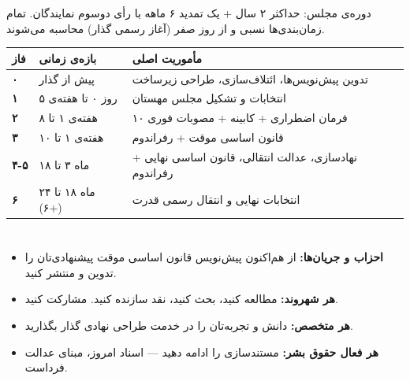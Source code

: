 \documentclass[a4paper,11pt]{article}
\begin{document}
\vspace{0.5\baselineskip}

{\footnotesize\textcolor{text-medium}{%
دوره‌ی مجلس: حداکثر ۲ سال + یک تمدید ۶ ماهه با رأی دوسوم نمایندگان.
تمام زمان‌بندی‌ها نسبی و از روز صفر (آغاز رسمی گذار) محاسبه می‌شوند.}}

\vspace{0.5\baselineskip}

\nopagebreak[4]%

\begin{center}
\setlength{\tabcolsep}{5pt}%
\begin{tabularx}{0.92\textwidth}{>{\centering\bfseries\small}p{1cm}
>{\centering\small}p{3cm} >{\small\RaggedRight}X}
\toprule
\rowcolor{bg-light-blue}
\textcolor{mahestan-blue}{فاز} &
\textcolor{mahestan-blue}{\bfseries بازه‌ی زمانی} &
\textcolor{mahestan-blue}{\bfseries مأموریت اصلی} \\
\midrule
۰ & پیش از گذار &
تدوین پیش‌نویس‌ها، ائتلاف‌سازی، طراحی زیرساخت \\
\rowcolor{bg-gray}
۱ & روز ۰ تا هفته‌ی ۵ &
انتخابات و تشکیل مجلس مهستان \\
۲ & هفته‌ی ۱ تا ۸ &
۱۰ فرمان اضطراری + کابینه + مصوبات فوری \\
\rowcolor{bg-gray}
۳ & هفته‌ی ۱ تا ۱۰ &
قانون اساسی موقت + رفراندوم \\
۴-۵ & ماه ۳ تا ۱۸ &
نهادسازی، عدالت انتقالی، قانون اساسی نهایی + رفراندوم \\
\rowcolor{bg-gray}
۶ & ماه ۱۸ تا ۲۴ (+۶) &
انتخابات نهایی و انتقال رسمی قدرت \\
\bottomrule
\end{tabularx}
\end{center}

\section{}

\begin{greenbox}[title={\rl{دعوت از همه‌ی ایرانیان آزادیخواه}}]
\begin{itemize}[itemsep=6pt, font=\small]
\item[\textcolor{mahestan-blue}{\textbullet}]
\textbf{احزاب و جریان‌ها:}
از هم‌اکنون پیش‌نویس قانون اساسی موقت پیشنهادی‌تان را
تدوین و منتشر کنید.
\item[\textcolor{mahestan-green}{\textbullet}]
\textbf{هر شهروند:}
مطالعه کنید، بحث کنید، نقد سازنده کنید. مشارکت کنید.
\item[\textcolor{mahestan-orange}{\textbullet}]
\textbf{هر متخصص:}
دانش و تجربه‌تان را در خدمت طراحی نهادی گذار بگذارید.
\item[\textcolor{mahestan-red}{\textbullet}]
\textbf{هر فعال حقوق بشر:}
مستندسازی را ادامه دهید --- اسناد امروز، مبنای عدالت فرداست.
\end{itemize}
\end{greenbox}
\end{document}

